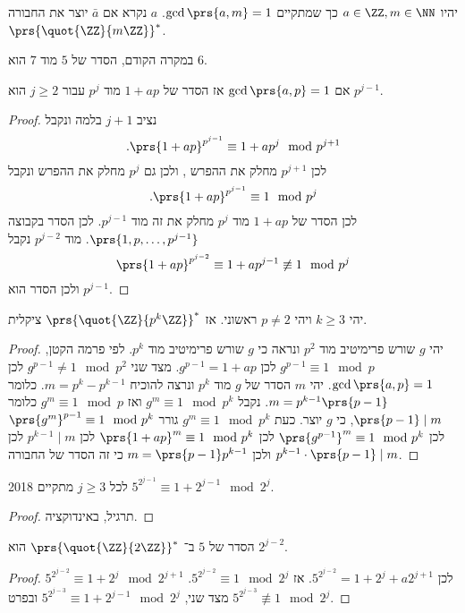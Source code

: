 \documentclass[a4paper,10pt,twoside,openany]{book}
\begin{document}
\begin{definition}
יהיו
$a \in \ZZ, m \in \NN$
כך שמתקיים
$\gcd \prs{a,m} = 1$.
$a$
נקרא
אם
$\bar{a}$
יוצר את החבורה
$\prs{\quot{\ZZ}{m\ZZ}}^*$.
\end{definition}
\begin{example}
במקרה הקודם, הסדר של
$5$
מוד
$7$
הוא
$6$.
\end{example}

\begin{corollary}
אם
$\gcd\prs{a,p} = 1$
אז הסדר של
$1+ap$
מוד
$p^j$
עבור
$j\geq 2$
הוא
$p^{j-1}$.
\end{corollary}
\begin{proof}
נציב
$j+1$
בלמה ונקבל
\[\text{.}\prs{1+ap}^{p^{j-1}} \equiv 1 + ap^j \mod{p^{j+1}}\]
לכן
$p^{j+1}$
מחלק את ההפרש , ולכן גם
$p^j$
מחלק את ההפרש ונקבל
\[\text{.} \prs{1+ap}^{p^{j-1}} \equiv 1 \mod{p^j}\]
לכן הסדר של
$1+ap$
מוד
$p^j$
מחלק את זה מוד
$p^{j-1}$.
לכן הסדר בקבוצה
$\prs{1,p,\ldots, p^{j-1}}$.
מוד
$p^{j-2}$
נקבל
\[\prs{1+ap}^{p^{j-2}} \equiv 1 + ap^{j-1} \not\equiv 1 \mod{p^j}\]
ולכן הסדר הוא
$p^{j-1}$.
\end{proof}

\begin{theorem}
יהי
$k \geq 3$
ויהי
$p \neq 2$
ראשוני.
אז
$\prs{\quot{\ZZ}{p^k \ZZ}}^*$
ציקלית.
\end{theorem}

\begin{proof}
יהי
$g$
שורש פרימיטיב מוד
$p^2$
ונראה כי
$g$
שורש פרימיטיב מוד
$p^k$.
לפי פרמה הקטן,
$g^{p-1} \equiv 1 \mod{p}$
לכן
$g^{p-1} = 1 + ap$.
מצד שני
$g^{p-1} \neq 1 \mod{p^2}$
לכן
$\gcd\prs{a,p} = 1$.
יהי
$m$
הסדר של
$g$
מוד
$p^k$
ונרצה להוכיח
$m = p^k - p^{k-1}$.
כלומר
$m = p^{k-1}\prs{p-1}$.
נקבל
$g^m \equiv 1 \mod{p^k}$
ואז
$g^m \equiv 1 \mod{p}$
כלומר
$\prs{p-1} \mid m$,
כי
$g$
יוצר.
כעת
$g^m \equiv 1 \mod{p^k}$
גורר
$\prs{g^m}^{p-1} \equiv 1 \mod{p^k}$
לכן
$\prs{g^{p-1}}^{m} \equiv 1 \mod{p^k}$
לכן
$\prs{1+ap}^m \equiv 1 \mod{p^k}$
לכן
$p^{k-1} \mid m$
לכן
$p^{k-1} \cdot \prs{p-1} \mid m$
ולכן
$m = \prs{p-1}p^{k-1}$
כי זה הסדר של החבורה.
\end{proof}

\begin{proposition}
לכל
$j \geq 3$
מתקיים%
%
{2018}%
$5^{2^{j-1}} \equiv 1 + 2^{j-1} \mod{2^j}$.
\end{proposition}
\begin{proof}
תרגיל, באינדוקציה.
\end{proof}
\begin{corollary}
הסדר של
$5$
ב־%
$\prs{\quot{\ZZ}{2\ZZ}}^*$
הוא
$2^{j-2}$.
\end{corollary}
\begin{proof}
$5^{2^{j-2}} \equiv 1 + 2^j \mod{2^{j+1}}$
לכן
$5^{2^{j-2}} = 1 + 2^j + a2^{j+1}$.
אז
$5^{2^{j-2}} \equiv 1 \mod{2^j}$.
מצד שני,
$5^{2^{j-3}} \equiv 1 + 2^{j-1} \mod{2^j}$
ובפרט
$5^{2^{j-3}} \not\equiv 1 \mod{2^j}$.
\end{proof}
\end{document}
